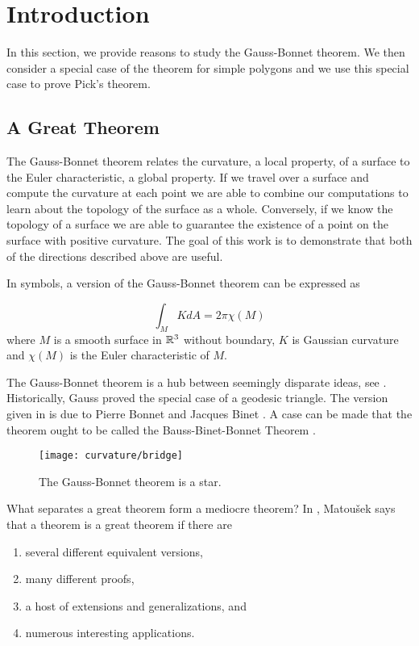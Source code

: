 \section{Introduction}
\label{sec:intro}

In this section, we provide reasons to study the Gauss-Bonnet theorem. We then consider a special case of the theorem for simple polygons and we use this special case to prove Pick's theorem.

\subsection{A Great Theorem}
The Gauss-Bonnet theorem relates the curvature, a local property, of a surface
to the Euler characteristic, a global property. If we travel over a surface and compute the curvature
at each point we are able to combine our computations to learn about the topology of the surface
as a whole. Conversely, if we know the topology of a surface we are able to 
guarantee the existence of a point on the surface with positive curvature. 
The goal of this work is to demonstrate that both of the directions described above are useful.


In symbols, a version of the Gauss-Bonnet theorem can be expressed as

\begin{equation}\label{eqn:g-b-noboundary}
		\int_MK dA =2\pi \chi(M)
\end{equation}
where $M$ is a smooth surface in $\mathbb{R}^3$ without boundary, $K$ is Gaussian curvature
and $\chi(M)$ is the Euler characteristic of $M$.


The Gauss-Bonnet theorem is a hub between seemingly disparate ideas, see . 
Historically,  Gauss proved the special case of a geodesic triangle\cite{dombrowski-79,gauss_disquisitiones_1827}.  
The version given in  is due to Pierre Bonnet
and Jacques Binet \cite{bonnet1848memoire}. A case can be made that the theorem
ought to be called the Bauss-Binet-Bonnet Theorem
\cite{wu_historical_2008}.

\begin{figure}[htb]
\centering
\texttt{[image: curvature/bridge]}
\caption{The Gauss-Bonnet theorem is a star.}
\label{fig:bridge}
\end{figure}

What separates a great theorem form a mediocre theorem?
In \cite{jm08}, Matou\v{s}ek says that a theorem is a great theorem if there are
\begin{enumerate}[(1)]
\item several different equivalent versions,
\item many different proofs,
\item a host of extensions and generalizations, and
\item numerous interesting applications.
\end{enumerate}

